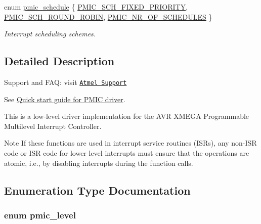 \begin{DoxyCompactItemize}
enum \hyperlink{group__pmic__group_ga68099717e4fa4e95f12943d3e3e55d79}{pmic\-\_\-schedule} \{ \hyperlink{group__pmic__group_gga68099717e4fa4e95f12943d3e3e55d79a8a553d9366e1553ea610ab6582698b23}{P\-M\-I\-C\-\_\-\-S\-C\-H\-\_\-\-F\-I\-X\-E\-D\-\_\-\-P\-R\-I\-O\-R\-I\-T\-Y}, 
\hyperlink{group__pmic__group_gga68099717e4fa4e95f12943d3e3e55d79a29065590de0ddf49e19afb6de1646c79}{P\-M\-I\-C\-\_\-\-S\-C\-H\-\_\-\-R\-O\-U\-N\-D\-\_\-\-R\-O\-B\-I\-N}, 
\hyperlink{group__pmic__group_gga68099717e4fa4e95f12943d3e3e55d79a3359fcef75642d8a546102a0bd7065cd}{P\-M\-I\-C\-\_\-\-N\-R\-\_\-\-O\-F\-\_\-\-S\-C\-H\-E\-D\-U\-L\-E\-S}
 \}
\begin{DoxyCompactList}\small\item\em Interrupt scheduling schemes. \end{DoxyCompactList}\end{DoxyCompactItemize}


\subsection{Detailed Description}
Support and F\-A\-Q\-: visit \href{http://www.atmel.com/design-support/}{\tt Atmel Support}

See \hyperlink{xmega_pmic_quickstart}{Quick start guide for P\-M\-I\-C driver}.

This is a low-\/level driver implementation for the A\-V\-R X\-M\-E\-G\-A Programmable Multilevel Interrupt Controller.

\begin{DoxyNote}{Note}
If these functions are used in interrupt service routines (I\-S\-Rs), any non-\/\-I\-S\-R code or I\-S\-R code for lower level interrupts must ensure that the operations are atomic, i.\-e., by disabling interrupts during the function calls. 
\end{DoxyNote}


\subsection{Enumeration Type Documentation}
\hypertarget{group__pmic__group_ga786c118f55440742904207a0e1d269f9}{
\subsubsection[{pmic\-\_\-level}]{\setlength{\rightskip}{0pt plus 5cm}enum {\bf pmic\-\_\-level}}}\label{group__pmic__group_ga786c118f55440742904207a0e1d269f9}


